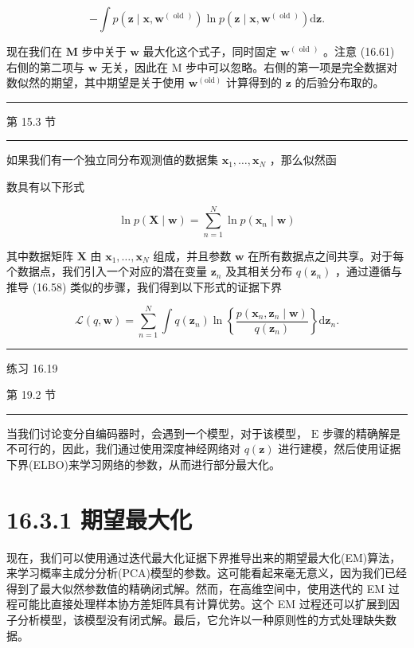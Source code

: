 \documentclass[10pt]{article}
\newcommand{\HRule}{\begin{center}\rule{0.9\linewidth}{0.2mm}\end{center}}
\begin{document}
\[
- \int p\left( {\mathbf{z} \mid  \mathbf{x},{\mathbf{w}}^{\left( \text{ old }\right) }}\right) \ln p\left( {\mathbf{z} \mid  \mathbf{x},{\mathbf{w}}^{\left( \text{ old }\right) }}\right) \mathrm{d}\mathbf{z}. \tag{16.61}
\]

现在我们在 \(\mathbf{M}\) 步中关于 \(\mathbf{w}\) 最大化这个式子，同时固定 \({\mathbf{w}}^{\left( \text{ old }\right) }\) 。注意 (16.61) 右侧的第二项与 \(\mathbf{w}\) 无关，因此在 M 步中可以忽略。右侧的第一项是完全数据对数似然的期望，其中期望是关于使用 \({\mathbf{w}}^{\left( \mathrm{{old}}\right) }\) 计算得到的 \(\mathbf{z}\) 的后验分布取的。

\HRule

第 15.3 节

\HRule

如果我们有一个独立同分布观测值的数据集 \({\mathbf{x}}_{1},\ldots ,{\mathbf{x}}_{N}\) ，那么似然函

数具有以下形式

\[
\ln p\left( {\mathbf{X} \mid  \mathbf{w}}\right)  = \mathop{\sum }\limits_{{n = 1}}^{N}\ln p\left( {{\mathbf{x}}_{n} \mid  \mathbf{w}}\right)  \tag{16.62}
\]

其中数据矩阵 \(\mathbf{X}\) 由 \({\mathbf{x}}_{1},\ldots ,{\mathbf{x}}_{N}\) 组成，并且参数 \(\mathbf{w}\) 在所有数据点之间共享。对于每个数据点，我们引入一个对应的潜在变量 \({\mathbf{z}}_{n}\) 及其相关分布 \(q\left( {\mathbf{z}}_{n}\right)\) ，通过遵循与推导 (16.58) 类似的步骤，我们得到以下形式的证据下界

\[
\mathcal{L}\left( {q,\mathbf{w}}\right)  = \mathop{\sum }\limits_{{n = 1}}^{N}\int q\left( {\mathbf{z}}_{n}\right) \ln \left\{  \frac{p\left( {{\mathbf{x}}_{n},{\mathbf{z}}_{n} \mid  \mathbf{w}}\right) }{q\left( {\mathbf{z}}_{n}\right) }\right\}  \mathrm{d}{\mathbf{z}}_{n}. \tag{16.63}
\]

\HRule

练习 16.19

第 19.2 节

\HRule

当我们讨论变分自编码器时，会遇到一个模型，对于该模型， \(\mathrm{E}\) 步骤的精确解是不可行的，因此，我们通过使用深度神经网络对 \(q\left( \mathbf{z}\right)\) 进行建模，然后使用证据下界(ELBO)来学习网络的参数，从而进行部分最大化。

\section*{16.3.1 期望最大化}

现在，我们可以使用通过迭代最大化证据下界推导出来的期望最大化(EM)算法，来学习概率主成分分析(PCA)模型的参数。这可能看起来毫无意义，因为我们已经得到了最大似然参数值的精确闭式解。然而，在高维空间中，使用迭代的 EM 过程可能比直接处理样本协方差矩阵具有计算优势。这个 EM 过程还可以扩展到因子分析模型，该模型没有闭式解。最后，它允许以一种原则性的方式处理缺失数据。
\end{document}

